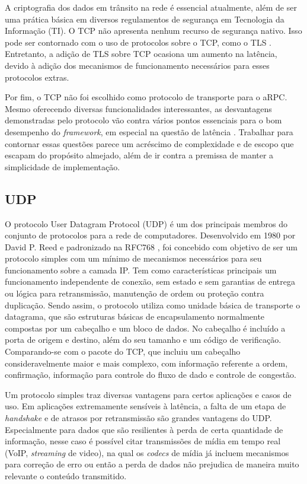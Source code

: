 A criptografia dos dados em trânsito na rede é essencial atualmente, além de ser uma prática básica em diversos regulamentos de segurança em Tecnologia da Informação (TI). O TCP não apresenta nenhum recurso de segurança nativo. Isso pode ser contornado com o uso de protocolos sobre o TCP, como o TLS \cite{rfc5246}. Entretanto, a adição de TLS sobre TCP ocasiona um aumento na latência, devido à adição dos mecanismos de funcionamento necessários para esses protocolos extras.

Por fim, o TCP não foi escolhido como protocolo de transporte para o aRPC. Mesmo oferecendo diversas funcionalidades interessantes, as desvantagens demonstradas pelo protocolo vão contra vários pontos essenciais para o bom desempenho do \textit{framework}, em especial na questão de latência \cite{lakshman1997performance}. Trabalhar para contornar essas questões parece um acréscimo de complexidade e de escopo que escapam do propósito almejado, além de ir contra a premissa de manter a simplicidade de implementação.

\subsection{UDP}
\label{subsec:udp}

O protocolo User Datagram Protocol (UDP) é um dos principais membros do conjunto de protocolos para a rede de computadores. Desenvolvido em 1980 por David P. Reed e padronizado na RFC768 \cite{postel_user_1980}, foi concebido com objetivo de ser um protocolo simples com um mínimo de mecanismos necessários para seu funcionamento sobre a camada IP. Tem como características principais um funcionamento independente de conexão, sem estado e sem garantias de entrega ou lógica para retransmissão, manutenção de ordem ou proteção contra duplicação. Sendo assim, o protocolo utiliza como unidade básica de transporte o datagrama, que são estruturas básicas de encapsulamento normalmente compostas por um cabeçalho e um bloco de dados. No cabeçalho é incluído a porta de origem e destino, além do seu tamanho e um código de verificação. Comparando-se com o pacote do TCP, que incluiu um cabeçalho consideravelmente maior e mais complexo, com informação referente a ordem, confirmação, informação para controle do fluxo de dado e controle de congestão.

Um protocolo simples traz diversas vantagens para certos aplicações e casos de uso. Em aplicações extremamente sensíveis à latência, a falta de um etapa de \textit{handshake} e de atrasos por retransmissão são grandes vantagens do UDP. Especialmente para dados que são resilientes à perda de certa quantidade de informação, nesse caso é possível citar transmissões de mídia em tempo real (VoIP, \textit{streaming} de video), na qual os \textit{codecs} de mídia já incluem mecanismos para correção de erro ou então a perda de dados não prejudica de maneira muito relevante o conteúdo transmitido.

